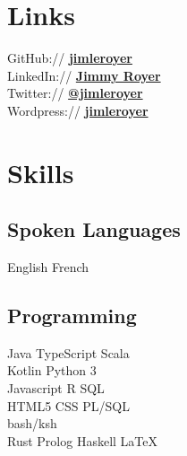 \documentclass[letterpaper]{deedy-resume} %
\begin{document}
\begin{minipage}[t]{0.33\textwidth} %


\section{Links}

GitHub:// \href{https://github.com/jimleroyer/}{\bf jimleroyer} \\
LinkedIn:// \href{https://ca.linkedin.com/in/jimleroyer/}{\bf Jimmy Royer} \\
Twitter:// \href{https://twitter.com/jimleroyer}{\bf @jimleroyer} \\
Wordpress:// \href{http://jimleroyer.wordpress.com/}{\bf jimleroyer}

\sectionspace %


\section{Skills}

\subsection{Spoken Languages}

English \textbullet{} French

\sectionspace %

\subsection{Programming}

Java \textbullet{} TypeScript \textbullet{} Scala \\
Kotlin \textbullet{} Python 3 \\
Javascript \textbullet{} R \textbullet{} SQL \\ 
HTML5 \textbullet{} CSS \textbullet{} PL/SQL \\
bash/ksh \\ 
Rust \textbullet{} Prolog \textbullet{} Haskell \textbullet{} \LaTeX\


\end{minipage}
\end{document}

